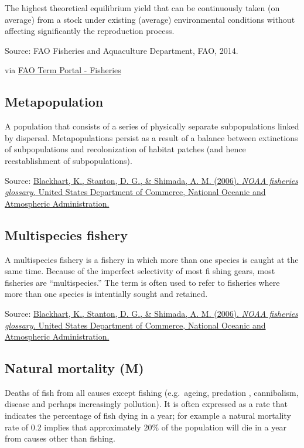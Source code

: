 \documentclass[
  11pt,
]{book}
\begin{document}
The highest theoretical equilibrium yield that can be continuously taken (on average) from a stock under existing (average) environmental conditions without affecting significantly the reproduction process.

Source: FAO Fisheries and Aquaculture Department, FAO, 2014.

via \href{http://www.fao.org/fishery/glossary/en}{FAO Term Portal - Fisheries}

\hypertarget{metapopulation}{%
\subsection{Metapopulation}\label{metapopulation}}

A population that consists of a series of physically separate subpopulations linked by dispersal.
Metapopulations persist as a result of a balance between
extinctions of subpopulations and recolonization
of habitat patches (and hence reestablishment of
subpopulations).

Source: \href{https://repository.library.noaa.gov/view/noaa/12856}{Blackhart, K., Stanton, D. G., \& Shimada, A. M. (2006). \emph{NOAA fisheries glossary.} United States Department of Commerce, National Oceanic and Atmospheric Administration.}

\hypertarget{multispecies-fishery}{%
\subsection{Multispecies fishery}\label{multispecies-fishery}}

A multispecies fishery is a fishery in which more than one species is caught at the same time. Because of the imperfect selectivity of most fi shing gears, most fisheries are ``multispecies.'' The term is often used to refer to fisheries where more than one species is intentially sought and retained.

Source: \href{https://repository.library.noaa.gov/view/noaa/12856}{Blackhart, K., Stanton, D. G., \& Shimada, A. M. (2006). \emph{NOAA fisheries glossary.} United States Department of Commerce, National Oceanic and Atmospheric Administration.}

\hypertarget{natural-mortality-m}{%
\subsection{Natural mortality (M)}\label{natural-mortality-m}}

Deaths of fish from all causes except fishing (e.g.~ageing, predation , cannibalism, disease and perhaps increasingly pollution). It is often expressed as a rate that indicates the percentage of fish dying in a year; for example a natural mortality rate of 0.2 implies that approximately 20\% of the population will die in a year from causes other than fishing.
\end{document}
